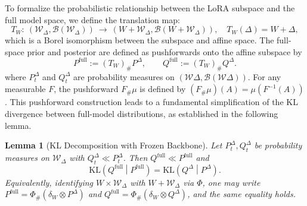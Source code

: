 \documentclass{article} %
\newtheorem{lemma}{Lemma}
\begin{document}
To formalize the probabilistic relationship between the LoRA subspace and the full model space, we define the translation map:
\[
T_W:\ (\mathcal W_\Delta,\mathcal B(\mathcal W_\Delta))\ \to\ (W+\mathcal W_\Delta,\mathcal B(W+\mathcal W_\Delta)),\quad
T_W(\Delta)=W+\Delta,
\]
which is a Borel isomorphism between the subspace and affine space.  The full-space prior and posterior are defined as pushforwards onto the affine subspace by
\[
P^{\mathrm{full}}:=(T_W)_{\text{\#}} P^{\Delta},\qquad
Q^{\mathrm{full}}:=(T_W)_{\text{\#}} Q^{\Delta}.
\]
where $P_t^{\Delta}$ and $Q_t^{\Delta}$ are probability measures on $(\mathcal{W}\Delta, \mathcal{B}(\mathcal{W}\Delta))$.
For any measurable $F$, the pushforward $F_{\text{\#}}\mu$ is defined by $(F_{\#}\mu)(A)=\mu(F^{-1}(A))$. This pushforward construction leads to a fundamental simplification of the KL divergence between full-model distributions, as established in the following lemma.


\begin{lemma}[KL Decomposition with Frozen Backbone]\label{lem:kl-decomposition}
Let $P_t^{\Delta}, Q_t^{\Delta}$ be probability measures on $\mathcal{W}_\Delta$ with $Q_t^{\Delta} \ll P_t^{\Delta}$. Then $Q^{\mathrm{full}}\ll P^{\mathrm{full}}$ and
\[
\mathrm{KL}\left(Q^{\mathrm{full}}\middle|P^{\mathrm{full}}\right)
=\mathrm{KL}\left(Q^{\Delta}\middle|P^{\Delta}\right).
\]
Equivalently, identifying ${W}\times\mathcal W_\Delta$ with $W+\mathcal W_\Delta$ via $\Phi$, one may write
$P^{\mathrm{full}}=\Phi_{\text{\#}}(\delta_W\otimes P^{\Delta})$ and
$Q^{\mathrm{full}}=\Phi_{\text{\#}}(\delta_W\otimes Q^{\Delta})$, and the same equality holds.
\end{lemma}
 

\end{document}
